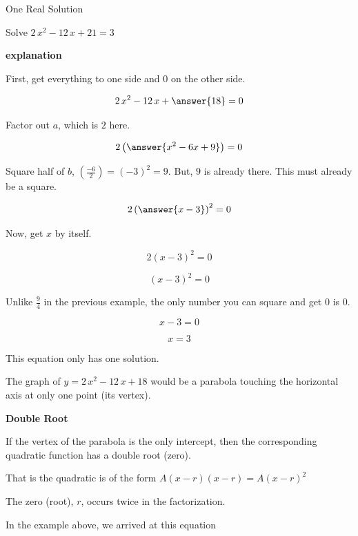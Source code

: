 \documentclass{ximera}
\begin{document}
\begin{example} One Real Solution

Solve $2 \, x^2 - 12 \, x + 21 = 3$ 


\textbf{\textcolor{red!75!green}{explanation}} 



First, get everything to one side and $0$ on the other side.



\[  2 \, x^2 - 12 \, x + \answer{18} = 0  \]

Factor out $a$, which is $2$ here.

\[  2 \left( \answer{x^2 - 6x + 9} \right) = 0  \]


Square half of $b$, $\left(\frac{-6}{2}\right) = (-3)^2 = 9$.  But, $9$ is already there.  This must already be a square.



\[  2 \left( \answer{x - 3} \right)^2 = 0  \]


Now, get $x$ by itself.

\[  2 (x - 3)^2 = 0  \]

\[  (x - 3)^2 = 0  \]


Unlike $\frac{9}{4}$ in the previous example, the only number you can square and get $0$ is $0$.

\[  x - 3 = 0  \]

\[  x = 3  \]


This equation only has one solution.



\end{example}



The graph of $y = 2 \, x^2 - 12\, x + 18$ would be a parabola touching the horizontal axis at only one point (its vertex).




\begin{idea} \textbf{\textcolor{blue!55!black}{Double Root}} 

If the vertex of the parabola is the only intercept, then the corresponding quadratic function has a double root (zero).

That is the quadratic is of the form  $A (x - r)(x - r) = A (x - r)^2$

The zero (root), $r$, occurs twice in the factorization.

\end{idea}



In the example above, we arrived at this equation
\end{document}
